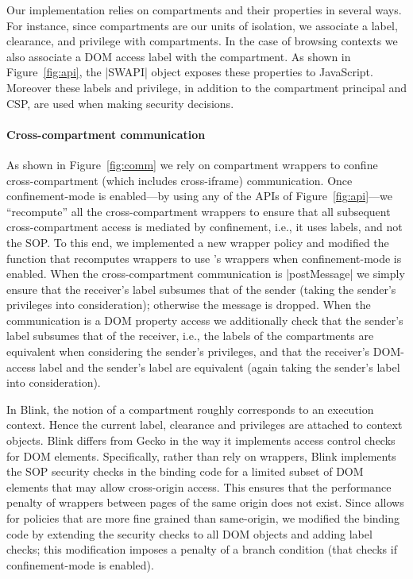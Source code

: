 Our implementation relies on compartments and their properties in
several ways.
%
For instance, since compartments are our units of isolation, we
associate a label, clearance, and privilege with compartments.
%
In the case of browsing contexts we also associate a DOM access label
with the compartment.
%
As shown in Figure~\ref{fig:api}, the \js|SWAPI| object exposes these
properties to JavaScript.
% 
Moreover these labels and privilege, in addition to the compartment
principal and CSP, are used when making security decisions.

\paragraph{Cross-compartment communication}
%
As shown in Figure~\ref{fig:comm} we rely on compartment wrappers to
confine cross-compartment (which includes cross-iframe) communication.
%
Once confinement-mode is enabled---by using any of the APIs of
Figure~\ref{fig:api}---we ``recompute'' all the cross-compartment
wrappers to ensure that all subsequent cross-compartment access is
mediated by confinement, i.e., it uses labels, and not the SOP.
%
To this end, we implemented a new wrapper policy and modified the
function that recomputes wrappers to use \sys{}'s wrappers when
confinement-mode is enabled.
%
When the cross-compartment communication is \js|postMessage| we simply
ensure that the receiver's label subsumes that of the sender (taking
the sender's privileges into consideration); otherwise the message is
dropped.
%
When the communication is a DOM property access we additionally check
that the sender's label subsumes that of the receiver, i.e., the labels of
the compartments are equivalent when considering the sender's
privileges, and that the receiver's DOM-access label and the sender's
label are equivalent (again taking the sender's label into
consideration).

In Blink, the notion of a compartment roughly corresponds to an
execution context.
%
Hence the current label, clearance and privileges are attached to
context objects.
%
Blink differs from Gecko in the way it implements access control checks for
DOM elements. 
%
Specifically, rather than rely on wrappers, Blink implements the SOP
security checks in the binding code for a limited subset of DOM
elements that may allow cross-origin access.
%
This ensures that the performance penalty of wrappers between pages of the same
origin does not exist.
%
Since \sys{} allows for policies that are more fine grained than
same-origin, we modified the binding code by extending the security
checks to all DOM objects and adding label checks; this modification
imposes a penalty of a branch condition (that checks if
confinement-mode is enabled).

